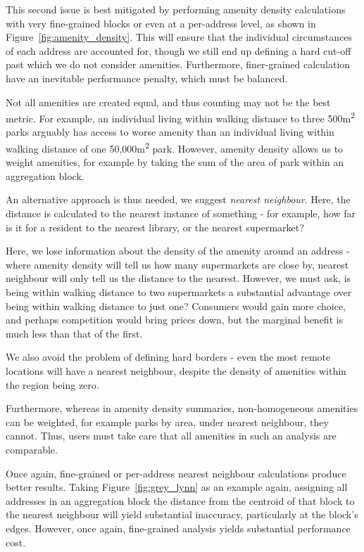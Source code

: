 \documentclass[12pt,a4paper]{article}
\begin{document}
This second issue is best mitigated by performing amenity density calculations with very fine-grained blocks or even at a per-address level, as shown in Figure~\ref{fig:amenity_density}. This will ensure that the individual circumstances of each address are accounted for, though we still end up defining a hard cut-off past which we do not consider amenities. Furthermore, finer-grained calculation have an inevitable performance penalty, which must be balanced.

Not all amenities are created equal, and thus counting may not be the best metric. For example, an individual living within walking distance to three 500m\textsuperscript{2} parks arguably has access to worse amenity than an individual living within walking distance of one 50,000m\textsuperscript{2} park. However, amenity density allows us to weight amenities, for example by taking the sum of the area of park within an aggregation block.

An alternative approach is thus needed, we suggest \emph{nearest neighbour}. Here, the distance is calculated to the nearest instance of something - for example, how far is it for a resident to the nearest library, or the nearest supermarket?

Here, we lose information about the density of the amenity around an address - where amenity density will tell us how many supermarkets are close by, nearest neighbour will only tell us the distance to the nearest. However, we must ask, is being within walking distance to two supermarkets a substantial advantage over being within walking distance to just one? Consumers would gain more choice, and perhaps competition would bring prices down, but the marginal benefit is much less than that of the first. 

We also avoid the problem of defining hard borders - even the most remote locations will have a nearest neighbour, despite the density of amenities within the region being zero.

Furthermore, whereas in amenity density summaries, non-homogeneous amenities can be weighted, for example parks by area, under nearest neighbour, they cannot. Thus, users must take care that all amenities in such an analysis are comparable.

Once again, fine-grained or per-address nearest neighbour calculations produce better results. Taking Figure~\ref{fig:grey_lynn} as an example again, assigning all addresses in an aggregation block the distance from the centroid of that block to the nearest neighbour will yield substantial inaccuracy, particularly at the block's edges. However, once again, fine-grained analysis yields substantial performance cost.
\end{document}
